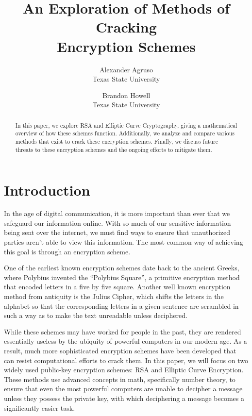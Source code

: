 \documentclass[letterpaper,twocolumn,12pt]{article}
\begin{document}
    \date{}

    \title{ An Exploration of Methods of Cracking \\
        Encryption Schemes }

    \author{
        { \rm Alexander Agruso } \\
        { \rm Texas State University }
        \and
        { \rm Brandon Howell } \\
        { \rm Texas State University }
    }

    \maketitle

    \begin{abstract}
        In this paper, we explore RSA and Elliptic Curve Cryptography, giving a
        mathematical overview of how these schemes function.
        Additionally, we analyze and compare various methods that exist to
        crack these encryption schemes.
        Finally, we discuss future threats to these encryption schemes
        and the ongoing efforts to mitigate them.
    \end{abstract}

    \section*{Introduction}

    In the age of digital communication, it is more important than ever that we
    safeguard our information online.
    With so much of our sensitive information being sent over the internet, we
    must find ways to ensure that unauthorized parties aren't able to view this
    information.
    The most common way of achieving this goal is through an encryption scheme.
    
    One of the earliest known encryption schemes date back to the ancient
    Greeks, where Polybius invented the ``Polybius Square'', a primitive
    encryption method that encoded letters in a five by five square.
    Another well known encryption method from antiquity is the Julius Cipher,
    which shifts the letters in the alphabet so that the corresponding letters
    in a given sentence are scrambled in such a way as to make the text
    unreadable unless deciphered.
    ~\cite{JD:History}

    While these schemes may have worked for people in the past, they are
    rendered essentially useless by the ubiquity of powerful computers in our
    modern age.
    As a result, much more sophisticated encryption schemes have been developed
    that can resist computational efforts to crack them. In this paper, we will
    focus on two widely used public-key encryption schemes: RSA and Elliptic
    Curve Encryption.
    These methods use advanced concepts in math, specifically number theory, to
    ensure that even the most powerful computers are unable to decipher a
    message unless they possess the private key, with which deciphering a
    message becomes a significantly easier task.
    
\end{document}
